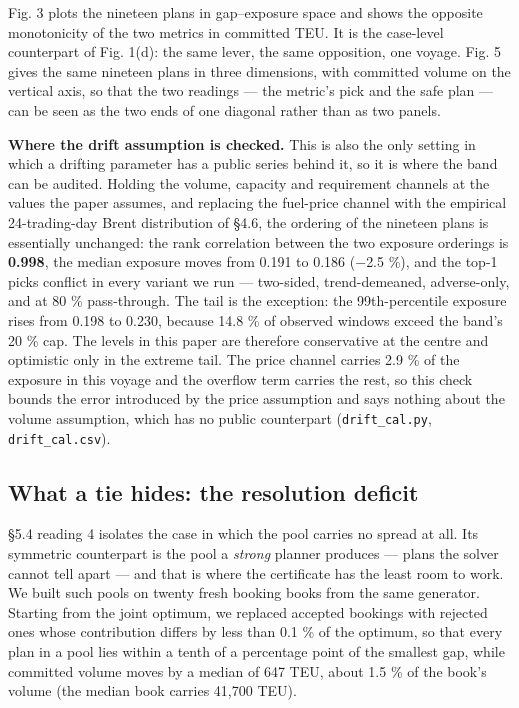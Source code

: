\documentclass[preprint,12pt,letterpaper]{elsarticle}
\theoremstyle{definition}
\theoremstyle{plain}
\begin{document}
Fig. 3 plots the nineteen plans in gap--exposure space and shows the opposite monotonicity of the two metrics in committed TEU. It is the case-level counterpart of Fig. 1(d): the same lever, the same opposition, one voyage. Fig. 5 gives the same nineteen plans in three dimensions, with committed volume on the vertical axis, so that the two readings --- the metric's pick and the safe plan --- can be seen as the two ends of one diagonal rather than as two panels.

\textbf{Where the drift assumption is checked.} This is also the only setting in which a drifting parameter has a public series behind it, so it is where the band can be audited. Holding the volume, capacity and requirement channels at the values the paper assumes, and replacing the fuel-price channel with the empirical 24-trading-day Brent distribution of \S 4.6, the ordering of the nineteen plans is essentially unchanged: the rank correlation between the two exposure orderings is \textbf{0.998}, the median exposure moves from 0.191 to 0.186 ($-$2.5 \%), and the top-1 picks conflict in every variant we run --- two-sided, trend-demeaned, adverse-only, and at 80 \% pass-through. The tail is the exception: the 99th-percentile exposure rises from 0.198 to 0.230, because 14.8 \% of observed windows exceed the band's 20 \% cap. The levels in this paper are therefore conservative at the centre and optimistic only in the extreme tail. The price channel carries 2.9 \% of the exposure in this voyage and the overflow term carries the rest, so this check bounds the error introduced by the price assumption and says nothing about the volume assumption, which has no public counterpart (\texttt{drift\_\allowbreak{}cal.\allowbreak{}py}, \texttt{drift\_\allowbreak{}cal.\allowbreak{}csv}).

\subsection{What a tie hides: the resolution deficit}

\S 5.4 reading 4 isolates the case in which the pool carries no spread at all. Its symmetric counterpart is the pool a \textit{strong} planner produces --- plans the solver cannot tell apart --- and that is where the certificate has the least room to work. We built such pools on twenty fresh booking books from the same generator. Starting from the joint optimum, we replaced accepted bookings with rejected ones whose contribution differs by less than 0.1 \% of the optimum, so that every plan in a pool lies within a tenth of a percentage point of the smallest gap, while committed volume moves by a median of 647 TEU, about 1.5 \% of the book's volume (the median book carries 41,700 TEU).
\end{document}
